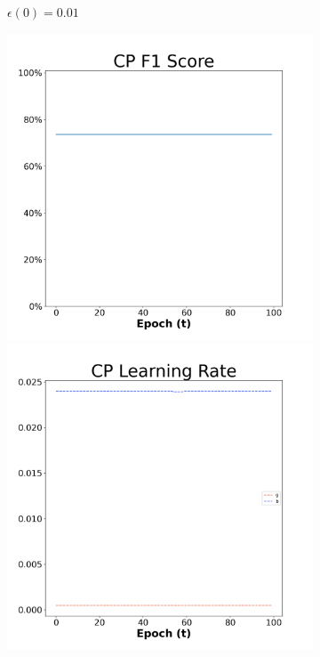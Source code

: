 \begin{figure}[H]
\begin{subfigure}{0.3\textwidth}
  \caption{$\epsilon(0)=0.01$}
\end{subfigure}\hfil %
\begin{subfigure}{0.3\textwidth}
  \includegraphics[width=\linewidth]{images/exper2/Ionosphere/CP_0.03_f1.png}
  \includegraphics[width=\linewidth]{images/exper2/Ionosphere/CP_0.03_lr.png}

\end{subfigure}
\end{figure}
